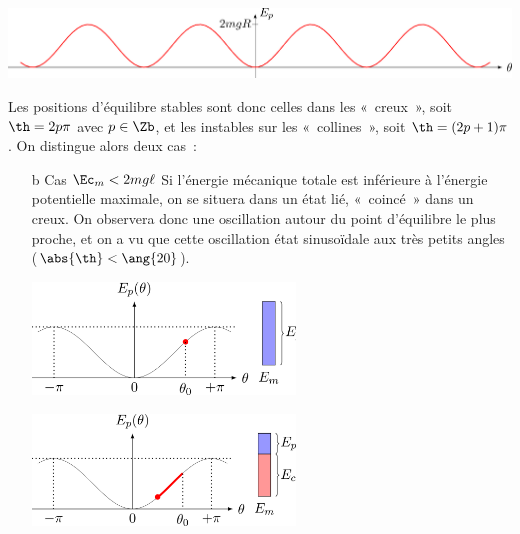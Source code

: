 \documentclass[../../main/main.tex]{subfiles}
\begin{document}
\begin{center}
	\includegraphics[scale=1]{stab_pend-a}
\end{center}
Les positions d'équilibre stables sont donc celles dans les «~creux~», soit $\th =
	2p\pi$ avec $p\in\Zb$, et les instables sur les «~collines~», soit $\th =
	(2p+1)\pi$. On distingue alors deux cas~:

\begin{itemize}
	\item[b]{Cas $\Ec_m < 2mg\ell$}
	      \smallbreak
	      Si l'énergie mécanique totale est inférieure à l'énergie potentielle
	      maximale, on se situera dans un état lié, «~coincé~» dans un creux. On
	      observera donc une oscillation autour du point d'équilibre le plus
	      proche, et on a vu que cette
	      oscillation état sinusoïdale aux très petits angles ($\abs{\th} <
		      \ang{20}$).

	      \begin{minipage}{0.45\linewidth}
		      \begin{center}
			      \includegraphics[width=7cm]{stab_pend-b}
		      \end{center}
	      \end{minipage}
	      \hfill
	      \begin{minipage}{0.45\linewidth}
		      \begin{center}
			      \includegraphics[width=7cm]{stab_pend-c}
		      \end{center}
	      \end{minipage}


\end{itemize}
\end{document}
